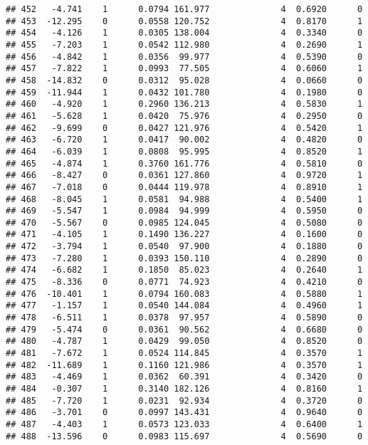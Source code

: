 \documentclass[
]{article}
\begin{document}
\begin{verbatim}
## 452   -4.741    1      0.0794 161.977              4  0.6920      0
## 453  -12.295    0      0.0558 120.752              4  0.8170      1
## 454   -4.126    1      0.0305 138.004              4  0.3340      0
## 455   -7.203    1      0.0542 112.980              4  0.2690      1
## 456   -4.842    1      0.0356  99.977              4  0.5390      0
## 457   -7.822    1      0.0993  77.505              4  0.6060      1
## 458  -14.832    0      0.0312  95.028              4  0.0660      0
## 459  -11.944    1      0.0432 101.780              4  0.1980      0
## 460   -4.920    1      0.2960 136.213              4  0.5830      1
## 461   -5.628    1      0.0420  75.976              4  0.2950      0
## 462   -9.699    0      0.0427 121.976              4  0.5420      1
## 463   -6.720    1      0.0417  90.002              4  0.4820      0
## 464   -6.039    1      0.0808  95.995              4  0.8520      1
## 465   -4.874    1      0.3760 161.776              4  0.5810      0
## 466   -8.427    0      0.0361 127.860              4  0.9720      1
## 467   -7.018    0      0.0444 119.978              4  0.8910      1
## 468   -8.045    1      0.0581  94.988              4  0.5400      1
## 469   -5.547    1      0.0984  94.999              4  0.5950      0
## 470   -5.567    0      0.0985 124.045              4  0.5080      0
## 471   -4.105    1      0.1490 136.227              4  0.1600      0
## 472   -3.794    1      0.0540  97.900              4  0.1880      0
## 473   -7.280    1      0.0393 150.110              4  0.2890      0
## 474   -6.682    1      0.1850  85.023              4  0.2640      1
## 475   -8.336    0      0.0771  74.923              4  0.4210      0
## 476  -10.401    1      0.0794 160.083              4  0.5880      1
## 477   -1.157    1      0.0540 144.084              4  0.4960      1
## 478   -6.511    1      0.0378  97.957              4  0.5890      0
## 479   -5.474    0      0.0361  90.562              4  0.6680      0
## 480   -4.787    1      0.0429  99.050              4  0.8520      0
## 481   -7.672    1      0.0524 114.845              4  0.3570      1
## 482  -11.689    1      0.1160 121.986              4  0.3570      1
## 483   -4.469    1      0.0362  60.391              4  0.3420      0
## 484   -0.307    1      0.3140 182.126              4  0.8160      1
## 485   -7.720    1      0.0231  92.934              4  0.3720      0
## 486   -3.701    0      0.0997 143.431              4  0.9640      0
## 487   -4.403    1      0.0573 123.033              4  0.6400      1
## 488  -13.596    0      0.0983 115.697              4  0.5690      0

\end{verbatim}
\end{document}
